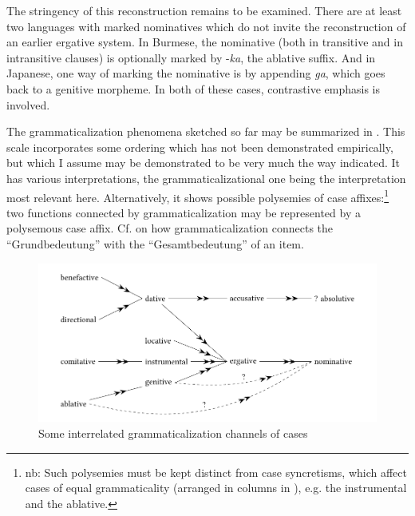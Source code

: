 The stringency of this reconstruction remains to be examined. There are at least two languages with marked nominatives which do not invite the reconstruction of an earlier ergative system. In Burmese, the nominative (both in transitive and in intransitive clauses) is optionally marked by -\textit{ka}, the ablative suffix. And in Japanese, one way of marking the nominative is by appending \textit{ga}, which goes back to a genitive morpheme. In both of these cases, contrastive emphasis is involved.

The grammaticalization phenomena sketched so far may be summarized in . This scale incorporates some ordering which has not been demonstrated empirically, but which I assume may be demonstrated to be very much the way indicated. It has various interpretations, the grammaticalizational one being the interpretation most relevant here. Alternatively, it shows possible polysemies of case affixes:\footnote{nb: Such polysemies must be kept distinct from case syncretisms, which affect cases of equal grammaticality (arranged in columns in ), e.g. the instrumental and the ablative.} two functions connected by grammaticalization may be represented by a polysemous case affix. Cf.  on how grammaticalization connects the ``Grundbedeutung'' with the ``Gesamtbedeutung'' of an item.

\begin{figure}
\includegraphics[width=.9\textwidth]{figures/8-someinterrelated.pdf}
\caption{Some interrelated grammaticalization channels of cases} \label{F8}
\end{figure}

